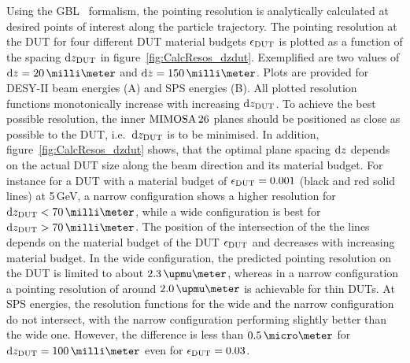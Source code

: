 Using the GBL~\cite{Blobel20111760,Kleinwort-2012} formalism, the pointing resolution is analytically calculated at desired points of interest along the particle trajectory. 
The pointing resolution at the DUT for four different DUT material budgets $\mathnormal{\epsilon_{\textrm{DUT}}}$ is plotted as a function of the spacing $\textrm{d}z_{\textrm{DUT}}$ in figure~\ref{fig:CalcResos_dzdut}.
Exemplified are two values of $\dz = 20\,\milli\meter$ and $\dz = 150\,\milli\meter$. 
Plots are provided for DESY-II beam energies (A) and SPS energies (B). 
All plotted resolution functions monotonically increase with increasing $\textrm{d}z_{\textrm{DUT}}$. 
To achieve the best possible resolution, the inner $\textrm{MIMOSA\,26}$ planes should be positioned as close as possible to the DUT, i.e.~$\textrm{d}z_{\textrm{DUT}}$ is to be minimised. 
In addition, figure~\ref{fig:CalcResos_dzdut} shows, that the optimal plane spacing $\textrm{d}z$ depends on the actual DUT size along the beam direction and its material budget.
For instance for a DUT with a material budget of $\mathnormal{\epsilon_{\textrm{DUT}}} = 0.001$ (black and red solid lines) at 5\,GeV, a narrow configuration shows a higher resolution for $\dzdut < 70\,\milli\meter$,
 while a wide configuration is best for $\dzdut > 70\,\milli\meter$.
The position of the intersection of the the lines depends on the material budget of the DUT $\mathnormal{\epsilon_{\textrm{DUT}}}$ and decreases with increasing material budget. 
In the wide configuration, the predicted pointing resolution on the DUT is limited to about $2.3\,\upmu\meter$,
 whereas in a narrow configuration a pointing resolution of around $2.0\,\upmu\meter$ is achievable for thin DUTs.
At SPS energies, the resolution functions for the wide and the narrow configuration do not intersect, with the narrow configuration performing slightly better than the wide one.
However, the difference is less than $0.5\,\micro\meter$ for $\dzdut = 100\,\milli\meter$ even for $\mathnormal{\epsilon_{\textrm{DUT}}} = 0.03$. 

